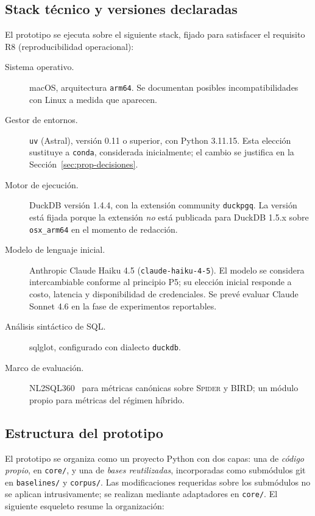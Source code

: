 \subsection{Stack técnico y versiones declaradas}
\label{subsec:prop-stack}

El prototipo se ejecuta sobre el siguiente stack, fijado para satisfacer el requisito R8 (reproducibilidad operacional):

\begin{description}
    \item[Sistema operativo.] macOS, arquitectura \texttt{arm64}. Se documentan posibles incompatibilidades con Linux a medida que aparecen.
    \item[Gestor de entornos.] \texttt{uv} (Astral), versión 0.11 o superior, con Python 3.11.15. Esta elección sustituye a \texttt{conda}, considerada inicialmente; el cambio se justifica en la Sección~\ref{sec:prop-decisiones}.
    \item[Motor de ejecución.] DuckDB versión 1.4.4, con la extensión community \texttt{duckpgq}. La versión está fijada porque la extensión \emph{no} está publicada para DuckDB 1.5.x sobre \texttt{osx\_arm64} en el momento de redacción.
    \item[Modelo de lenguaje inicial.] Anthropic Claude Haiku 4.5 (\texttt{claude-haiku-4-5}). El modelo se considera intercambiable conforme al principio P5; su elección inicial responde a costo, latencia y disponibilidad de credenciales. Se prevé evaluar Claude Sonnet 4.6 en la fase de experimentos reportables.
    \item[Análisis sintáctico de SQL.] sqlglot, configurado con dialecto \texttt{duckdb}.
    \item[Marco de evaluación.] NL2SQL360~\cite{SuperSQL2024} para métricas canónicas sobre \textsc{Spider} y \textsc{BIRD}; un módulo propio para métricas del régimen híbrido.
\end{description}

\subsection{Estructura del prototipo}
\label{subsec:prop-estructura}

El prototipo se organiza como un proyecto Python con dos capas: una de \emph{código propio}, en \texttt{core/}, y una de \emph{bases reutilizadas}, incorporadas como submódulos git en \texttt{baselines/} y \texttt{corpus/}. Las modificaciones requeridas sobre los submódulos no se aplican intrusivamente; se realizan mediante adaptadores en \texttt{core/}. El siguiente esqueleto resume la organización:

